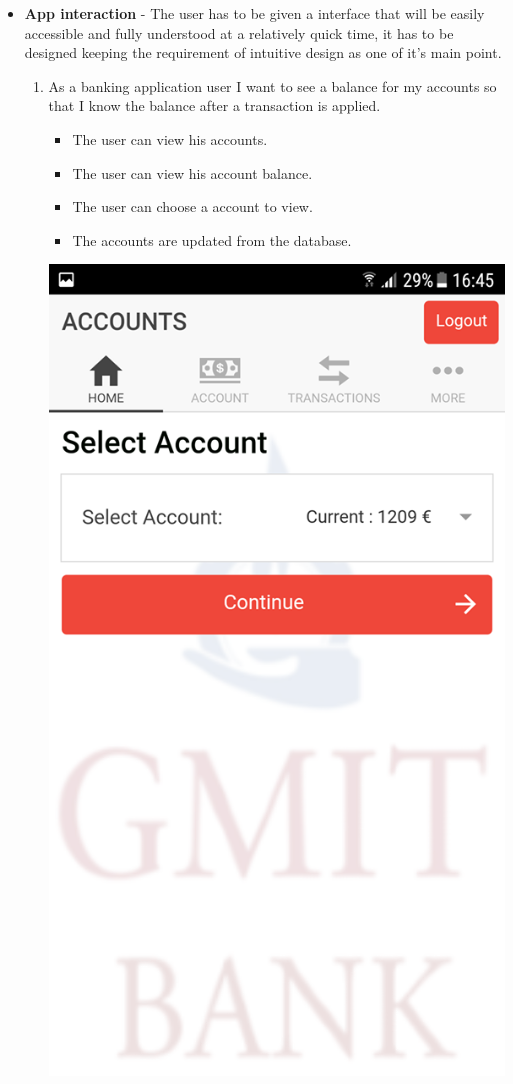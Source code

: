 \begin{itemize}
    \item  \textbf{App interaction} - The user has to be given a interface that will be easily accessible and fully understood at a relatively quick time, it has to be designed keeping the requirement of intuitive design as one of it's main point.
        \begin{enumerate}
        \item As a banking application user I want to see a balance for my accounts so that I know the balance after a transaction is applied. \cite{userStories}
            \begin{itemize}
                \item The user can view his accounts.
                \item The user can view his account balance.
                \item The user can choose a account to view.
                \item The accounts are updated from the database.
            \end{itemize}
\begin{center}
    \includegraphics[scale=0.5]{img/7homepageaccount.png}

\end{center}
\end{enumerate}
\end{itemize}
